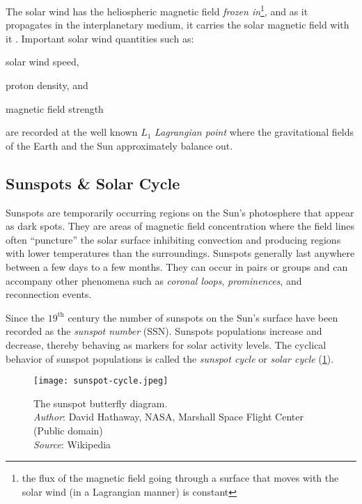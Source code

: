 The solar wind has the heliospheric magnetic field \emph{frozen in}\footnote{the flux of the 
magnetic field going through a surface that moves with the solar wind (in a Lagrangian manner) is 
constant}, and as it propagates in the interplanetary medium, it carries the solar magnetic field 
with it \citep{alfven1942existence,alfven1943existence}. Important solar wind quantities such as: 
%
\begin{enumerate*} 
    \item solar wind speed, 
    \item proton density, and  
    \item magnetic field strength 
\end{enumerate*}
% 
are recorded at the well known $L_1$ \emph{Lagrangian point} where the gravitational fields of the 
Earth and the Sun approximately balance out.



\subsection{Sunspots \& Solar Cycle}\label{sec:sunspots}

Sunspots are temporarily occurring regions on the Sun's photosphere that appear as dark spots. 
They are areas of magnetic field concentration where the field lines often \enquote{puncture} the 
solar surface inhibiting convection and producing regions with lower temperatures than the 
surroundings. Sunspots generally last anywhere between a few days to a few months. They can occur 
in pairs or groups and can accompany other phenomena such as \emph{coronal loops}, 
\emph{prominences}, and reconnection events.

Since the $19^{\text{th}}$ century the number of sunspots on the Sun's surface have been recorded 
as the \emph{sunspot number} (SSN). Sunspots populations increase and decrease, thereby behaving as 
markers for solar activity levels. The cyclical behavior of sunspot populations is called the 
\emph{sunspot cycle} or \emph{solar cycle} (\cref{fig:SolarCycle}). 

\begin{figure}
    \noindent\texttt{[image: sunspot-cycle.jpeg]}
    \caption{{\small The sunspot butterfly diagram.  \\ 
    \textit{Author}: David Hathaway, NASA, Marshall Space Flight Center (Public domain) \\ 
    \textit{Source}: Wikipedia}}
    \label{fig:SolarCycle}
\end{figure}

